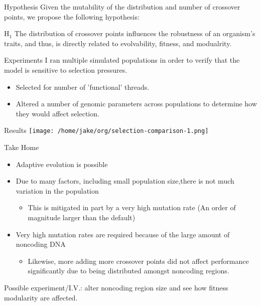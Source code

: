 \documentclass[aspectratio=169]{beamer}
\begin{document}
\begin{frame}[label=sec-1-3]{Hypothesis}
Given the mutability of the distribution and number of crossover points, we propose the following hypothesis:\\

\begin{block}{H$_{\text{1}}$}
The distribution of crossover points influences the robustness of an organism's traits, and thus, is directly related to evolvability, fitness, and modualrity.\\
\end{block}
\end{frame}

\begin{frame}[label=sec-1-4]{Experiments}
I ran multiple simulated populations in order to verify that the model is sensitive to selection pressures.
\begin{itemize}
\item Selected for number of 'functional' threads.
\item Altered a number of genomic parameters across populations to determine how they would affect selection.
\end{itemize}
\end{frame}

\begin{frame}[label=sec-1-5]{Results}
\texttt{[image: /home/jake/org/selection-comparison-1.png]}
\end{frame}

\begin{frame}[label=sec-1-6]{Take Home}
\begin{itemize}
\item Adaptive evolution is possible
\item Due to many factors, including small population size,there is not much variation in the population
\begin{itemize}
\item This is mitigated in part by a very high mutation rate (An order of magnitude larger than the default)
\end{itemize}
\item Very high mutation rates are required because of the large amount of noncoding DNA
\begin{itemize}
\item Likewise, more adding more crossover points did not affect performance significantly due to being distributed amongst noncoding regions.
\end{itemize}
\end{itemize}

\begin{block}{}
Possible experiment/I.V.: alter noncoding region size and see how fitness modularity are affected. 
\end{block}
\end{frame}
\end{document}
